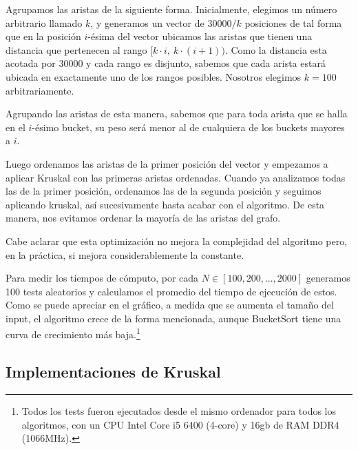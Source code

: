Agrupamos las aristas de la siguiente forma. Inicialmente, elegimos un número arbitrario llamado $k$, y generamos un vector de $30000 / k$ posiciones de tal forma que en la posición $i$-ésima del vector ubicamos las aristas que tienen una distancia que pertenecen al rango $[k \cdot i, \ k \cdot (i+1))$. Como la distancia esta acotada por 30000 y cada rango es disjunto, sabemos que cada arista estará ubicada en exactamente uno de los rangos posibles. Nosotros elegimos $k = 100$ arbitrariamente.

\vspace{1em}

Agrupando las aristas de esta manera, sabemos que para toda arista que se halla en el $i$-ésimo bucket, su peso será menor al de cualquiera de los buckets mayores a $i$.

\vspace{1em}

Luego ordenamos las aristas de la primer posición del vector y empezamos a aplicar Kruskal con las primeras aristas ordenadas. Cuando ya analizamos todas las de la primer posición, ordenamos las de la segunda posición y seguimos aplicando kruskal, así sucesivamente hasta acabar con el algoritmo. De esta manera, nos evitamos ordenar la mayoría de las aristas del grafo.

\vspace{1em}

Cabe aclarar que esta optimización no mejora la complejidad del algoritmo pero, en la práctica, si mejora considerablemente la constante. 

\vspace{1em}
Para medir los tiempos de cómputo, por cada $N \in [100, 200,..., 2000]$ generamos 100 tests aleatorios y calculamos el promedio del tiempo de ejecución de estos. Como se puede apreciar en el gráfico, a medida que se aumenta el tamaño del input, el algoritmo crece de la forma mencionada, aunque BucketSort tiene una curva de crecimiento más baja.\footnote{Todos los tests fueron ejecutados desde el mismo ordenador para todos los algoritmos, con un CPU Intel Core i5 6400 (4-core) y 16gb de RAM DDR4 (1066MHz).}



\newpage
\subsection{Implementaciones de Kruskal}
\vspace{1em}

